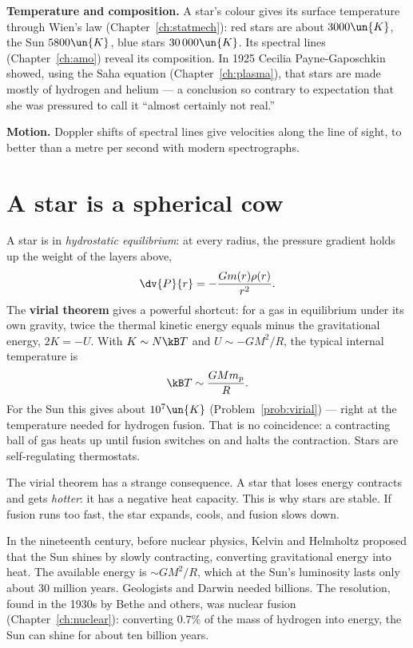 \textbf{Temperature and composition.} A star's colour gives its surface temperature through Wien's law (Chapter~\ref{ch:statmech}): red stars are about $3000\un{K}$, the Sun $5800\un{K}$, blue stars $30\,000\un{K}$. Its spectral lines (Chapter~\ref{ch:amo}) reveal its composition. In 1925 Cecilia Payne-Gaposchkin showed, using the Saha equation (Chapter~\ref{ch:plasma}), that stars are made mostly of hydrogen and helium --- a conclusion so contrary to expectation that she was pressured to call it ``almost certainly not real.''

\textbf{Motion.} Doppler shifts of spectral lines give velocities along the line of sight, to better than a metre per second with modern spectrographs.

\section{A star is a spherical cow}

A star is in \emph{hydrostatic equilibrium}: at every radius, the pressure gradient holds up the weight of the layers above,
\[
  \dv{P}{r} = -\frac{Gm(r)\rho(r)}{r^2}.
\]
The \textbf{virial theorem} gives a powerful shortcut: for a gas in equilibrium under its own gravity, twice the thermal kinetic energy equals minus the gravitational energy, $2K = -U$. With $K\sim N\kB T$ and $U\sim -GM^2/R$, the typical internal temperature is
\[
  \kB T\sim\frac{GMm_p}{R}.
\]
For the Sun this gives about $10^7\un{K}$ (Problem~\ref{prob:virial}) --- right at the temperature needed for hydrogen fusion. That is no coincidence: a contracting ball of gas heats up until fusion switches on and halts the contraction. Stars are self-regulating thermostats.

The virial theorem has a strange consequence. A star that loses energy contracts and gets \emph{hotter}: it has a negative heat capacity. This is why stars are stable. If fusion runs too fast, the star expands, cools, and fusion slows down.

In the nineteenth century, before nuclear physics, Kelvin and Helmholtz proposed that the Sun shines by slowly contracting, converting gravitational energy into heat. The available energy is $\sim GM^2/R$, which at the Sun's luminosity lasts only about $30$ million years. Geologists and Darwin needed billions. The resolution, found in the 1930s by Bethe and others, was nuclear fusion (Chapter~\ref{ch:nuclear}): converting $0.7\%$ of the mass of hydrogen into energy, the Sun can shine for about ten billion years.

